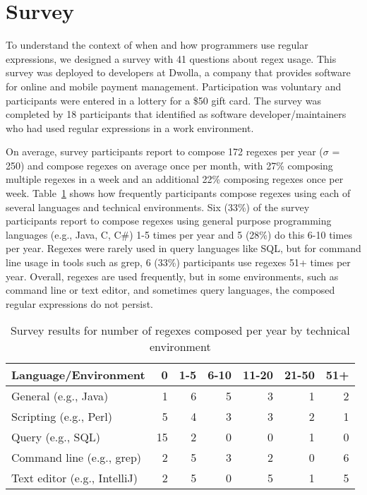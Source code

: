 \section{Survey}
\label{sec:survey}

To understand the context of when and how programmers use regular expressions,
we designed a survey with 41 questions about regex usage. This survey was
deployed to developers at Dwolla, a company that provides software for
 online and mobile payment management.
Participation was voluntary and participants were entered in a lottery for a \$50 gift card.
The survey was completed by 18 participants that identified as software developer/maintainers who had used regular expressions in a work environment.


On average, survey participants report to compose 172 regexes per year ($\sigma$ = 250) and compose regexes on average once per month, with 27\% composing multiple regexes in a week and an additional 22\% composing regexes once per week.
Table~\ref{tab:regexenviron} shows how frequently participants compose regexes using each of several languages and technical environments.
Six (33\%) of the survey participants report to compose regexes using general purpose programming languages (e.g., Java, C, C\#) 1-5 times per year and 5 (28\%) do this 6-10 times per year.  Regexes were rarely used in query languages like SQL, but for command line usage in tools such as grep, 6 (33\%) participants use regexes 51+ times per year. Overall, regexes are used frequently, but in some environments, such as command line or text editor, and sometimes query languages, the composed regular expressions do not persist.

\newcommand{\horiz}{\hspace{2.1pt}}

\begin{table}
\caption{Survey results for number of regexes composed per year by technical environment \label{tab:regexenviron}}
\begin{center}
\begin{small}
\begin{tabular}{l | r @{  \horiz} r @{ \horiz } r @{ \horiz } r @{ \horiz } r @{ \horiz } r }
Language/Environment & 0 & 1-5 & 6-10 & 11-20 & 21-50 & 51+ \\ \hline
General  (e.g., Java)  & 1 & 6 & 5 & 3& 1& 2 \\
Scripting  (e.g., Perl) &5 &4 &3 &3 &2  &1 \\
Query  (e.g., SQL) & 15&2 &0 &0 &1  & 0\\
Command line (e.g., grep)   &2 &5 &3 &2 &0  &6 \\
Text editor (e.g., IntelliJ)   & 2& 5& 0& 5& 1& 5\\
\end{tabular}
\end{small}
\end{center}
\end{table}

